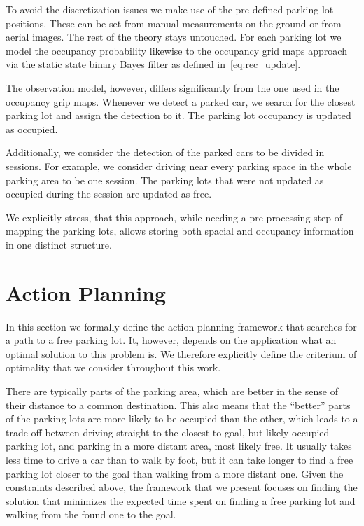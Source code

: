 To avoid the discretization issues we make use of the pre-defined parking lot
positions. These can be set from manual measurements on the ground or from
aerial images. The rest of the theory stays untouched. For each parking lot we
model the occupancy probability likewise to the occupancy grid maps approach
via the static state binary Bayes filter as defined in~\eqref{eq:rec_update}.

The observation model, however, differs significantly from the one used in the
occupancy grip maps. Whenever we detect a parked car, we search for the
closest parking lot and assign the detection to it. The parking lot occupancy
is updated as occupied.

Additionally, we consider the detection of the parked cars to be divided in
sessions. For example, we consider driving near every parking space in the
whole parking area to be one session. The parking lots that were not updated
as occupied during the session are updated as free.

We explicitly stress, that this approach, while needing a pre-processing step
of mapping the parking lots, allows storing both spacial and occupancy
information in one distinct structure.


\section{Action Planning} %
\label{sec:action_planning}

In this section we formally define the action planning framework that searches
for a path to a free parking lot. It, however, depends on the application what
an optimal solution to this problem is. We therefore explicitly define the
criterium of optimality that we consider throughout this work.

There are typically parts of the parking area, which are better in the sense
of their distance to a common destination. This also means that the ``better''
parts of the parking lots are more likely to be occupied than the other, which
leads to a trade-off between driving straight to the closest-to-goal, but
likely occupied parking lot, and parking in a more distant area, most likely
free. It usually takes less time to drive a car than to walk by foot, but it
can take longer to find a free parking lot closer to the goal than walking
from a more distant one. Given the constraints described above, the framework
that we present focuses on finding the solution that minimizes the expected
time spent on finding a free parking lot and walking from the found one to the
goal.

